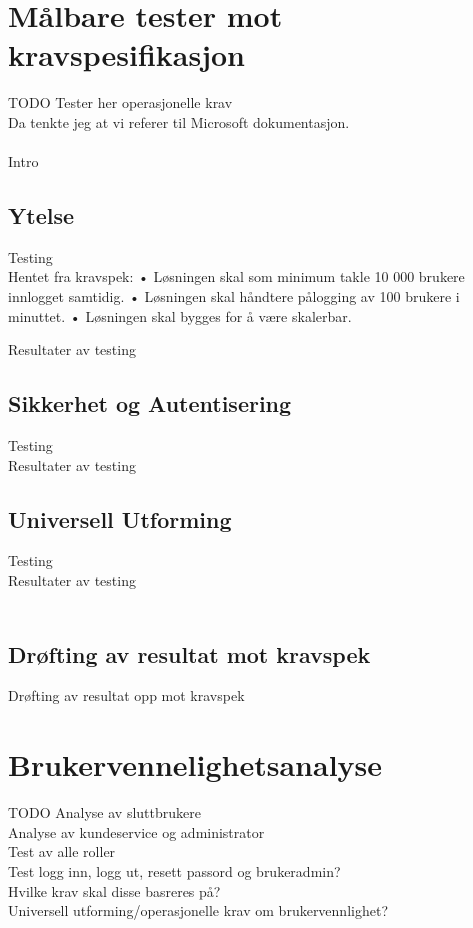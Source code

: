 \section{Målbare tester mot kravspesifikasjon}
\label{sec:testing_malbareTesterMotKravspesifikasjon}
{\color{red}TODO}
Tester her operasjonelle krav \\
Da tenkte jeg at vi referer til Microsoft dokumentasjon.\\
\\
Intro \\

\subsection{Ytelse}
\label{sec:testing_malbareTesterMotKravspesifikasjon_ytelse}
Testing \\

Hentet fra kravspek:
• Løsningen skal som minimum takle 10 000 brukere innlogget samtidig.
• Løsningen skal håndtere pålogging av 100 brukere i minuttet.
• Løsningen skal bygges for å være skalerbar.

Resultater av testing \\

\subsection{Sikkerhet og Autentisering}
\label{sec:testing_malbareTesterMotKravspesifikasjon_sikkerhetOgAutentisering}
Testing \\
Resultater av testing \\

\subsection{Universell Utforming}
\label{sec:testing_malbareTesterMotKravspesifikasjon_universellUtforming}
Testing \\
Resultater av testing \\
\\

\subsection{Drøfting av resultat mot kravspek}
\label{sec:testing_droftingAvResultatMotKravspek}
Drøfting av resultat opp mot kravspek \\

\section{Brukervennelighetsanalyse}
\label{sec:testing_brukervennelighetsanalyse}
{\color{red}TODO}
Analyse av sluttbrukere \\
Analyse av kundeservice og administrator \\
Test av alle roller \\
Test logg inn, logg ut, resett passord og brukeradmin? \\
Hvilke krav skal disse basreres på? \\
Universell utforming/operasjonelle krav om brukervennlighet? \\

